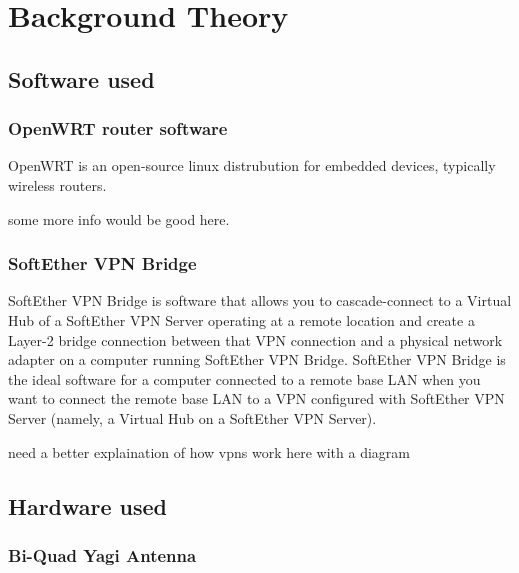 \section{Background Theory}

\subsection{Software used}
\subsubsection{OpenWRT router software}
OpenWRT is an open-source linux distrubution for embedded devices, typically wireless routers.

some more info would be good here.

\subsubsection{SoftEther VPN Bridge}
\label{sec:comms_theory_vpn} %
SoftEther VPN Bridge is software that allows you to cascade-connect to a Virtual Hub of a SoftEther VPN Server operating at a remote location and create a Layer-2 bridge connection between that VPN connection and a physical network adapter on a computer running SoftEther VPN Bridge. SoftEther VPN Bridge is the ideal software for a computer connected to a remote base LAN when you want to connect the remote base LAN to a VPN configured with SoftEther VPN Server (namely, a Virtual Hub on a SoftEther VPN Server).

need a better explaination of how vpns work here with a diagram 

\subsection{Hardware used}
\subsubsection{Bi-Quad Yagi Antenna}



